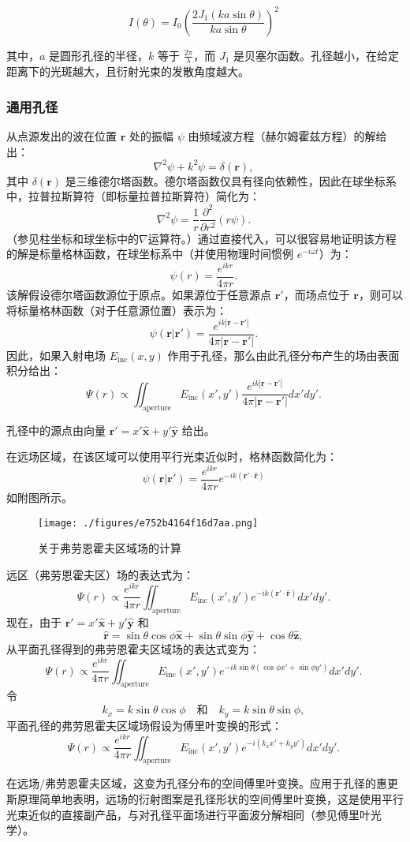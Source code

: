 \[ I(\theta) = I_0 \left( \frac{2J_1(ka \sin \theta)}{ka \sin \theta} \right)^2~\]

其中，\( a \) 是圆形孔径的半径，\( k \) 等于 \( \frac{2\pi}{\lambda} \)，而 \( J_1 \) 是贝塞尔函数。孔径越小，在给定距离下的光斑越大，且衍射光束的发散角度越大。
\subsubsection{通用孔径}  
从点源发出的波在位置 \(\mathbf{r}\) 处的振幅 \(\psi\) 由频域波方程（赫尔姆霍兹方程）的解给出：  
\[
\nabla^2 \psi + k^2 \psi = \delta (\mathbf{r}),~
\]  
其中 \(\delta (\mathbf{r})\) 是三维德尔塔函数。德尔塔函数仅具有径向依赖性，因此在球坐标系中，拉普拉斯算符（即标量拉普拉斯算符）简化为：  
\[
\nabla^2 \psi = \frac{1}{r} \frac{\partial^2}{\partial r^2} (r \psi).~
\]  
（参见柱坐标和球坐标中的\(\nabla\)运算符。）通过直接代入，可以很容易地证明该方程的解是标量格林函数，在球坐标系中（并使用物理时间惯例 \(e^{-i\omega t}\)）为：  
\[
\psi (r) = \frac{e^{ikr}}{4\pi r}.~
\]  
该解假设德尔塔函数源位于原点。如果源位于任意源点 \(\mathbf{r}'\)，而场点位于 \(\mathbf{r}\)，则可以将标量格林函数（对于任意源位置）表示为：  
\[
\psi (\mathbf{r} | \mathbf{r}') = \frac{e^{ik|\mathbf{r} - \mathbf{r}'|}}{4\pi |\mathbf{r} - \mathbf{r}'|}.~
\]  
因此，如果入射电场 \(E_{\mathrm{inc}}(x, y)\) 作用于孔径，那么由此孔径分布产生的场由表面积分给出：  
\[
\Psi (r) \propto \iint_{\mathrm{aperture}} E_{\mathrm{inc}}(x', y') \frac{e^{ik|\mathbf{r} - \mathbf{r}'|}}{4\pi |\mathbf{r} - \mathbf{r}'|} dx' dy'.~
\]

孔径中的源点由向量 \(\mathbf{r}' = x' \mathbf{\hat{x}} + y' \mathbf{\hat{y}}\) 给出。

在远场区域，在该区域可以使用平行光束近似时，格林函数简化为：
\[
\psi (\mathbf{r} |\mathbf{r}') = \frac{e^{ikr}}{4\pi r} e^{-ik(\mathbf{r}' \cdot \mathbf{\hat{r}})}~
\]
如附图所示。
\begin{figure}[ht]
\centering
\texttt{[image: ./figures/e752b4164f16d7aa.png]}
\caption{关于弗劳恩霍夫区域场的计算} \label{fig_YS_21}
\end{figure}
远区（弗劳恩霍夫区）场的表达式为：
\[
\Psi (r) \propto \frac{e^{ikr}}{4\pi r} \iint_{\text{aperture}} E_{\text{inc}}(x', y') e^{-ik(\mathbf{r}' \cdot \mathbf{\hat{r}})} dx' dy'.~
\]
现在，由于 \(\mathbf{r}' = x' \mathbf{\hat{x}} + y' \mathbf{\hat{y}}\) 和 
\[
\mathbf{\hat{r}} = \sin \theta \cos \phi \mathbf{\hat{x}} + \sin \theta \sin \phi \mathbf{\hat{y}} + \cos \theta \mathbf{\hat{z}},~
\]
从平面孔径得到的弗劳恩霍夫区域场的表达式变为：
\[
\Psi (r) \propto \frac{e^{ikr}}{4\pi r} \iint_{\text{aperture}} E_{\text{inc}}(x', y') e^{-ik \sin \theta (\cos \phi x' + \sin \phi y')} dx' dy'.~
\]
令
\[
k_{x} = k \sin \theta \cos \phi \quad \text{和} \quad k_{y} = k \sin \theta \sin \phi,~
\]
平面孔径的弗劳恩霍夫区域场假设为傅里叶变换的形式：
\[
\Psi (r) \propto \frac{e^{ikr}}{4\pi r} \iint_{\text{aperture}} E_{\text{inc}}(x', y') e^{-i(k_{x} x' + k_{y} y')} dx' dy'.~
\]

在远场/弗劳恩霍夫区域，这变为孔径分布的空间傅里叶变换。应用于孔径的惠更斯原理简单地表明，远场的衍射图案是孔径形状的空间傅里叶变换，这是使用平行光束近似的直接副产品，与对孔径平面场进行平面波分解相同（参见傅里叶光学）。